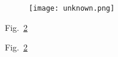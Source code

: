 \begin{figure}[htbp]
    \centering
    \texttt{[image: unknown.png]}
    \caption[]{}
    \label{fig:add_label}
\end{figure}
Fig.~\ref{fig:add_label}

\begin{figure}[htbp]
    \centering
    \quad
    \quad
    \caption[]{}
    \label{fig:add_label}
\end{figure}
Fig.~\ref{fig:add_label}

